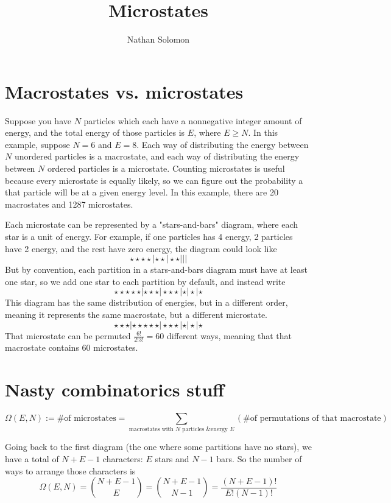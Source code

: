 \documentclass[12pt]{article}
\begin{document}
\title{Microstates}
\author{Nathan Solomon}
\maketitle

\section{Macrostates vs. microstates}
Suppose you have $N$ particles which each have a nonnegative integer amount of energy, and the total energy of those particles is $E$, where $E \geq N$. In this example, suppose $N=6$ and $E=8$. Each way of distributing the energy between $N$ unordered particles is a macrostate, and each way of distributing the energy between $N$ ordered particles is a microstate. Counting microstates is useful because every microstate is equally likely, so we can figure out the probability a that particle will be at a given energy level. In this example, there are 20 macrostates and 1287 microstates.

Each microstate can be represented by a "stars-and-bars" diagram, where each star is a unit of energy. For example, if one particles has 4 energy, 2 particles have 2 energy, and the rest have zero energy, the diagram could look like
\[\star \star \star \star | \star \star | \star \star | | |\]
But by convention, each partition in a stars-and-bars diagram must have at least one star, so we add one star to each partition by default, and instead write
\[\star \star \star \star \star | \star \star \star | \star \star \star | \star | \star | \star\]
This diagram has the same distribution of energies, but in a different order, meaning it represents the same macrostate, but a different microstate.
\[\star \star \star | \star \star \star \star \star | \star \star \star | \star | \star | \star\]
That microstate can be permuted $\frac{6!}{2!3!} = 60$ different ways, meaning that that macrostate contains 60 microstates.

\section{Nasty combinatorics stuff}

\[\Omega(E, N) := \text{\# of microstates} = \sum_{\text{macrostates with $N$ particles \& energy $E$}} (\text{\# of permutations of that macrostate})\]

Going back to the first diagram (the one where some partitions have no stars), we have a total of $N+E-1$ characters: $E$ stars and $N-1$ bars. So the number of ways to arrange those characters is
\[\Omega(E, N) = {{N+E-1} \choose E} = {{N+E-1} \choose {N-1}} = \frac{(N+E-1)!}{E!(N-1)!} \]
\end{document}
